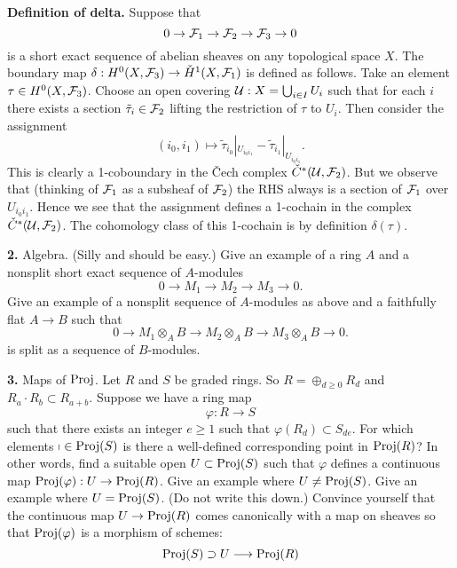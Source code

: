 \medskip\noindent
{\bf Definition of delta.} Suppose that 
$$
0 \to {\cal F}_1 \to {\cal F}_2 \to {\cal F}_3 \to 0
$$
is a short exact sequence of abelian sheaves on any topological space $X$.
The boundary map
$\delta : H^0(X, {\cal F}_3) \to {\mathaccent 20 H}^1(X, {\cal F}_1)$
is defined as follows. Take an element $\tau \in H^0(X, {\cal F}_3)$.
Choose an open covering ${\cal U} : X = \bigcup_{i\in I} U_i$ such
that for each $i$ there exists a section $\tilde \tau_i \in {\cal F}_2$
lifting the restriction of $\tau$ to $U_i$. Then consider the assignment
$$
(i_0, i_1) \longmapsto
\tilde \tau_{i_0}|_{U_{i_0i_1}} - \tilde \tau_{i_1}|_{U_{i_0i_1}}.
$$
This is clearly a 1-coboundary in the {\v C}ech complex
${\mathaccent 20 C}^\ast({\cal U}, {\cal F}_2)$. But we observe that
(thinking of ${\cal F}_1$ as a subsheaf of ${\cal F}_2$) the RHS
always is a section of ${\cal F}_1$ over $U_{i_0i_1}$. Hence we
see that the assignment defines a 1-cochain in the complex
${\mathaccent 20 C}^\ast({\cal U}, {\cal F}_2)$. The cohomology class of
this 1-cochain is by definition $\delta(\tau)$.

\medskip\item{\bf 2.} Algebra. (Silly and should be easy.)
 Give an example of a ring $A$ and a nonsplit
short exact sequence of $A$-modules
$$
0 \to M_1 \to M_2 \to M_3 \to 0.
$$
 Give an example of a nonsplit sequence of $A$-modules
as above and a faithfully flat $A \to B$ such that 
$$
0 \to M_1\otimes_AB \to M_2\otimes_AB \to M_3\otimes_AB \to 0.
$$
is split as a sequence of $B$-modules.

\medskip\item{\bf 3.} Maps of $\mathop{\rm Proj}$. Let $R$ and $S$ be graded rings. So
$R = \oplus_{d \geq 0} R_d$ and $R_a \cdot R_b \subset R_{a+b}$.
Suppose we have a ring map
$$
\varphi : R \to S
$$
such that there exists an integer $e \geq 1$ such that
$\varphi( R_d ) \subset S_{de}$.
 For which elements $\gp \in \Proj(S)$ is
there a well-defined corresponding point in $\mathop{\rm Proj}(R)$? In other words,
find a suitable open $U \subset \mathop{\rm Proj}(S)$ such that $\varphi$ defines
a continuous map $\mathop{\rm Proj}(\varphi) : U \to \mathop{\rm Proj}(R)$.
 Give an example where $U \not = \mathop{\rm Proj}(S)$.
 Give an example where $U = \mathop{\rm Proj}(S)$.
 (Do not write this down.) Convince yourself that 
the continuous map $U \to \mathop{\rm Proj}(R)$ comes canonically with
a map on sheaves so that $\mathop{\rm Proj}(\varphi)$ is a morphism of schemes:
$$
\mathop{\rm Proj}(S) \supset U \longrightarrow \mathop{\rm Proj}(R)
$$

